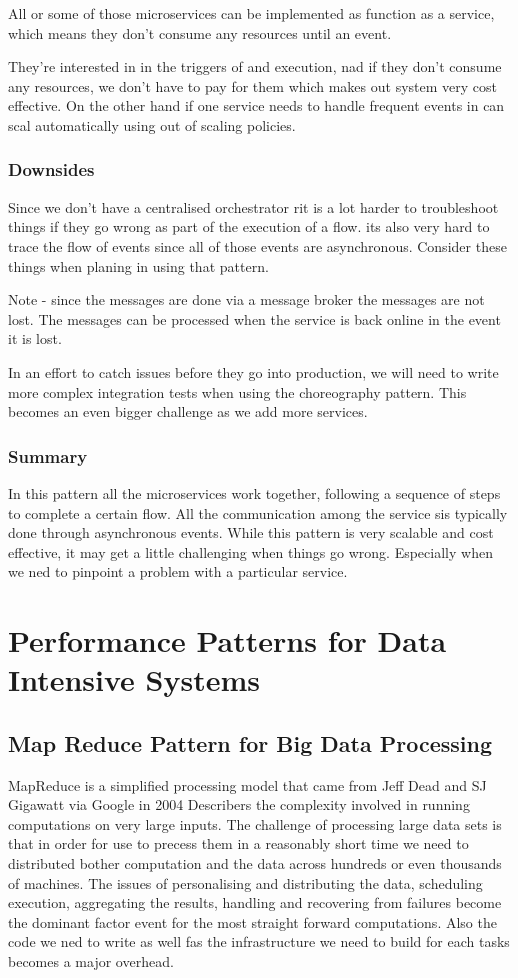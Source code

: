 All or some of those microservices can be implemented as function as a service, which means they don't consume any resources until an event.

They're interested in in the triggers of and execution, nad if they don't consume any resources, we don't have to pay for them which makes out system very cost effective.
On the other hand if one service needs to handle frequent events in can scal automatically using out of scaling policies.

\subsubsection{Downsides}
Since we don't have a centralised orchestrator rit is a lot harder to troubleshoot things if they go wrong as part of the execution of a flow.
its also very hard to trace the flow of events since all of those events are asynchronous.
Consider these things when planing in using that pattern.

Note - since the messages are done via a message broker the messages are not lost.
The messages can be processed when the service is back online in the event it is lost.

In an effort to catch issues before they go into production, we will need to write more complex integration tests when using the choreography pattern.
This becomes an even bigger challenge as we add more services.

\subsubsection{Summary}
In this pattern all the microservices work together, following a sequence of steps to complete a certain flow.
All the communication among the service sis typically done through asynchronous events.
While this pattern is very scalable and cost effective, it may get a little challenging when things go wrong.
Especially when we ned to pinpoint a problem with a particular service.

\section{Performance Patterns for Data Intensive Systems}

\subsection{Map Reduce Pattern for Big Data Processing}
MapReduce is a simplified processing model that came from Jeff Dead and SJ Gigawatt via Google in 2004
Describers the complexity involved in running computations on very large inputs.
The challenge of processing large data sets is that in order for use to precess them in a reasonably short time we need to distributed bother computation and the data across hundreds or even thousands of machines.
The issues of personalising and distributing the data, scheduling execution, aggregating the results, handling and recovering from failures become the dominant factor event for the most straight forward computations.
Also the code we ned to write as well fas the infrastructure we need to build for each tasks becomes a major overhead.

